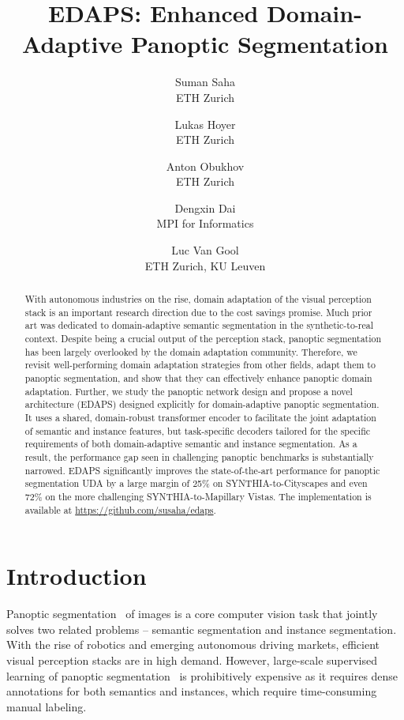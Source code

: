\documentclass[10pt,twocolumn,letterpaper]{article}
\begin{document}
\title{EDAPS: Enhanced Domain-Adaptive Panoptic Segmentation}


\author{
    Suman Saha \\
    ETH Zurich
    \and
    Lukas Hoyer \\
    ETH Zurich
    \and
    Anton Obukhov \\
    ETH Zurich
    \and
    Dengxin Dai \\
    MPI for Informatics
    \and
    Luc Van Gool \\
    ETH Zurich, KU Leuven
}

\maketitle


\begin{abstract}
With autonomous industries on the rise, domain adaptation of the visual perception stack is an important research direction due to the cost savings promise.
Much prior art was dedicated to domain-adaptive semantic segmentation in the synthetic-to-real context.
Despite being a crucial output of the perception stack, panoptic segmentation has been largely overlooked by the domain adaptation community.
Therefore, we revisit well-performing domain adaptation strategies from other fields, adapt them to panoptic segmentation, and show that they can effectively enhance panoptic domain adaptation.
Further, we study the panoptic network design and propose a novel architecture (EDAPS) designed explicitly for domain-adaptive panoptic segmentation. It uses a shared, domain-robust transformer encoder to facilitate the joint adaptation of semantic and instance features, but task-specific decoders tailored for the specific requirements of both domain-adaptive semantic and instance segmentation. As a result, the performance gap seen in challenging panoptic benchmarks is substantially narrowed. EDAPS significantly improves the state-of-the-art performance for panoptic segmentation UDA by a large margin of 25\% on SYNTHIA-to-Cityscapes and even 72\% on the more challenging SYNTHIA-to-Mapillary Vistas.
The implementation is available at {\footnotesize\url{https://github.com/susaha/edaps}}.
\end{abstract}

 \section{Introduction}
\label{sec:intro}
Panoptic segmentation~\cite{kirillov2019panoptic} of images is a core computer vision task that jointly solves two related problems -- semantic segmentation and instance segmentation. 
With the rise of robotics and emerging autonomous driving markets, efficient visual perception stacks are in high demand.
However, large-scale supervised learning of panoptic segmentation~\cite{cheng2019panoptic,kirillov2019panoptic,kirillov2019panopticFP,porzi2019seamless,xiong2019upsnet,mohan2021efficientps} 
is prohibitively expensive as it requires dense annotations for both semantics and instances, which require time-consuming manual labeling.
\end{document}
